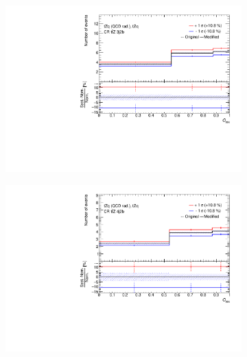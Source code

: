 \begin{figure}[!h]
\begin{subfigure}[b]{0.33\linewidth}
    \includegraphics[width=\textwidth]{ubonn-thesis/Chapters/Chapters_07/Figure/Data/Systematic/tZq_qcdrad/CR_3j2b_tZq_tZq_XS_QCDscale.pdf} 
    \caption{}
  \end{subfigure}%
  \newline
  \begin{subfigure}[b]{0.33\linewidth}
  \centering
    \includegraphics[width=\textwidth]{ubonn-thesis/Chapters/Chapters_07/Figure/Data/Systematic/tZq_qcdrad/CR_4j2b_tZq_tZq_XS_QCDscale.pdf} 
    \caption{}
  \end{subfigure} 
  \begin{subfigure}[b]{0.33\linewidth}
  \centering

\end{subfigure}
\end{figure}
